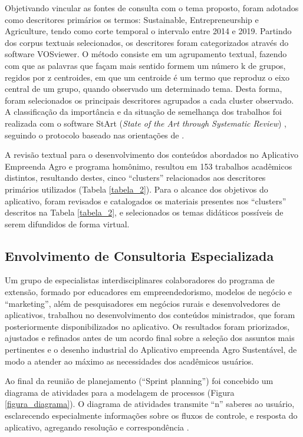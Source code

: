 Objetivando vincular as fontes de consulta com o tema proposto, foram adotados como descritores primários os termos: Sustainable, Entrepreneurship e Agriculture, tendo como corte temporal o intervalo entre 2014 e 2019. Partindo dos corpus textuais selecionados, os descritores foram categorizados através do software VOSviewer. O método consiste em um agrupamento textual, fazendo com que as palavras que façam mais sentido formem um número k de grupos, regidos por z centroides, em que um centroide é um termo que reproduz o eixo central de um grupo, quando observado um determinado tema. Desta forma, foram selecionados os principais descritores agrupados a cada cluster observado. A classificação da importância e da situação de semelhança dos trabalhos foi realizada com o software StArt (\textit{State of the Art through Systematic Review}) \cite{lapes_start_2005}, seguindo o protocolo baseado nas orientações de . 

A revisão textual para o desenvolvimento dos conteúdos abordados no Aplicativo Empreenda Agro e programa homônimo, resultou em 153 trabalhos acadêmicos distintos, resultando destes, cinco “clusters” relacionados aos descritores primários utilizados (Tabela \ref{tabela_2}). Para o alcance dos objetivos do aplicativo, foram revisados e catalogados os materiais presentes nos “clusters” descritos na Tabela \ref{tabela_2}, e selecionados os temas didáticos possíveis de serem difundidos de forma virtual.


\subsection{Envolvimento de Consultoria Especializada}

Um grupo de especialistas interdisciplinares colaboradores do programa de extensão, formado por educadores em empreendedorismo, modelos de negócio e “marketing”, além de pesquisadores em negócios rurais e desenvolvedores de aplicativos, trabalhou no desenvolvimento dos conteúdos ministrados, que foram posteriormente disponibilizados no aplicativo. Os resultados foram priorizados, ajustados e refinados antes de um acordo final sobre a seleção dos assuntos mais pertinentes e o desenho industrial do Aplicativo empreenda Agro Sustentável, de modo a atender ao máximo as necessidades dos acadêmicos usuários.

Ao final da reunião de planejamento (“Sprint planning”) foi concebido um diagrama de atividades para a modelagem de processos (Figura \ref{figura_diagrama}). O diagrama de atividades transmite “n” saberes ao usuário, esclarecendo especialmente informações sobre os fluxos de controle, e resposta do aplicativo, agregando resolução e correspondência \cite{pressman_engenharia_2016}.

